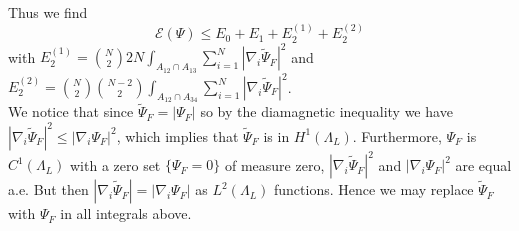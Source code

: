 \documentclass[a4paper,11pt]{article}
\newcommand{\abs}[1]{\left\lvert #1 \right\rvert}
\numberwithin{equation}{section}
\begin{document}
	Thus we find \begin{equation}\label{EqBound1}
	\mathcal{E}(\Psi)\leq E_0+E_1+E_2^{(1)}+E_2^{(2)}
	\end{equation}
	with $ E_2^{(1)}=\binom{N}{2}2N\int_{A_{12}\cap A_{13}}\sum_{i=1}^{N}\abs{\nabla_i\tilde{\Psi}_F}^2 $ and $ E_2^{(2)}=\binom{N}{2}\binom{N-2}{2}\int_{A_{12}\cap A_{34}}\sum_{i=1}^{N}\abs{\nabla_i\tilde{\Psi}_F}^2 $.\\
	We notice that since $ \tilde{\Psi}_F=\abs{\Psi_F} $ so by the diamagnetic inequality we have $ \abs{\nabla_i\tilde{\Psi}_F}^2\leq \abs{\nabla_i\Psi_F}^2 $, which implies that $ \tilde{\Psi}_F $ is in $ H^{1}(\Lambda_L) $. Furthermore, $ \Psi_F $ is $ C^{1}(\Lambda_L) $ with a zero set $ \{\Psi_F=0\} $ of measure zero, $ \abs{\nabla_i\tilde{\Psi}_F}^2 $ and $ \abs{\nabla_i\Psi_F}^2 $ are equal a.e. But then $ \abs{\nabla_i\tilde{\Psi}_F}=\abs{\nabla_i\Psi_F} $ as $ L^{2}(\Lambda_L) $ functions. Hence we may replace $ \tilde{\Psi}_F $ with $ \Psi_F $ in all integrals above.
	
\end{document}
